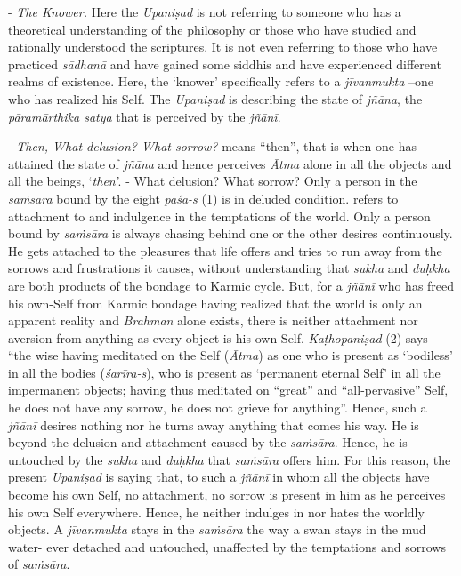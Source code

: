 - \emph{The Knower.} Here the \emph{Upaniṣad} is not referring to someone who has a theoretical understanding of the philosophy or those who have studied and rationally understood the scriptures. It is not even referring to those who have practiced \emph{sādhanā} and have gained some siddhis and have experienced different realms of existence. Here, the `knower' specifically refers to a \emph{jīvanmukta} --one who has realized his Self. The \emph{Upaniṣad} is describing the state of \emph{jñāna}, the \emph{pāramārthika satya} that is perceived by the \emph{jñānī}.

- \emph{Then, What delusion? What sorrow?}  means ``then'', that is when one has attained the state of \emph{jñāna} and hence perceives \emph{Ātma} alone in all the objects and all the beings, `\emph{then'}. - What delusion? What sorrow? Only a person in the \emph{saṁsāra} bound by the eight \emph{pāśa-s} (1) is in deluded condition.  refers to attachment to and indulgence in the temptations of the world. Only a person bound by \emph{saṁsāra} is always chasing behind one or the other desires continuously. He gets attached to the pleasures that life offers and tries to run away from the sorrows and frustrations it causes, without understanding that \emph{sukha} and \emph{duḥkha} are both products of the bondage to Karmic cycle. But, for a \emph{jñānī} who has freed his own-Self from Karmic bondage having realized that the world is only an apparent reality and \emph{Brahman} alone exists, there is neither attachment nor aversion from anything as every object is his own Self. \emph{Kaṭhopaniṣad} (2) says- ``the wise having meditated on the Self (\emph{Ātma}) as one who is present as `bodiless' in all the bodies (\emph{śarīra-s}), who is present as `permanent eternal Self' in all the impermanent objects; having thus meditated on ``great'' and ``all-pervasive'' Self, he does not have any sorrow, he does not grieve for anything''. Hence, such a \emph{jñānī} desires nothing nor he turns away anything that comes his way. He is beyond the delusion and attachment caused by the \emph{saṁsāra}. Hence, he is untouched by the \emph{sukha} and \emph{duḥkha} that \emph{saṁsāra} offers him. For this reason, the present \emph{Upaniṣad} is saying that, to such a \emph{jñānī} in whom all the objects have become his own Self, no attachment, no sorrow is present in him as he perceives his own Self everywhere. Hence, he neither indulges in nor hates the worldly objects. A \emph{jīvanmukta} stays in the \emph{saṁsāra} the way a swan stays in the mud water- ever detached and untouched, unaffected by the temptations and sorrows of \emph{saṁsāra}.

